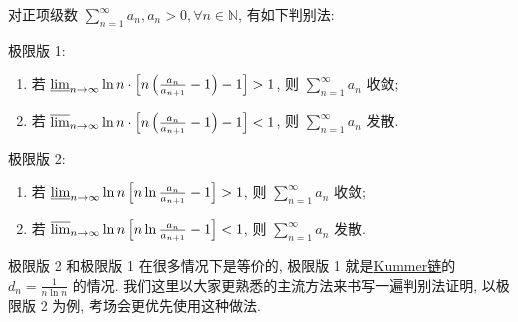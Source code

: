 \documentclass[../../main.tex]{subfiles}%
\begin{document}
\begin{theorem}[较为广泛的判别法]\label{theorem:较为广泛的判别法}
对正项级数 \( \sum_{n=1}^\infty a_n, a_n > 0, \forall n \in \mathbb{N} \), 有如下判别法:

极限版 1:
\begin{enumerate}
\item 若 \( \varliminf_{n \to \infty} \ln n \cdot \left[ n \left( \frac{a_n}{a_{n + 1}} - 1 \right) - 1 \right] > 1 \), 则 \( \sum_{n=1}^\infty a_n \) 收敛;

\item 若 \( \varlimsup_{n \to \infty} \ln n \cdot \left[ n \left( \frac{a_n}{a_{n + 1}} - 1 \right) - 1 \right] < 1 \), 则 \( \sum_{n=1}^\infty a_n \) 发散.
\end{enumerate}

极限版 2:
\begin{enumerate}
\item 若 \( \varliminf_{n \to \infty} \ln n \left[ n \ln \frac{a_n}{a_{n + 1}} - 1 \right] > 1 \), 则 \( \sum_{n=1}^\infty a_n \) 收敛;
\item 若 \( \varlimsup_{n \to \infty} \ln n \left[ n \ln \frac{a_n}{a_{n + 1}} - 1 \right] < 1 \), 则 \( \sum_{n=1}^\infty a_n \) 发散.
\end{enumerate}
\end{theorem}
\begin{note}
极限版 2 和极限版 1 在很多情况下是等价的, 极限版 1 就是\hyperref[theorem:Kummer链]{Kummer链}的 \( d_n = \frac{1}{n \ln n} \) 的情况. 我们这里以大家更熟悉的主流方法来书写一遍判别法证明, 以极限版 2 为例, 考场会更优先使用这种做法.
\end{note}
\end{document}
